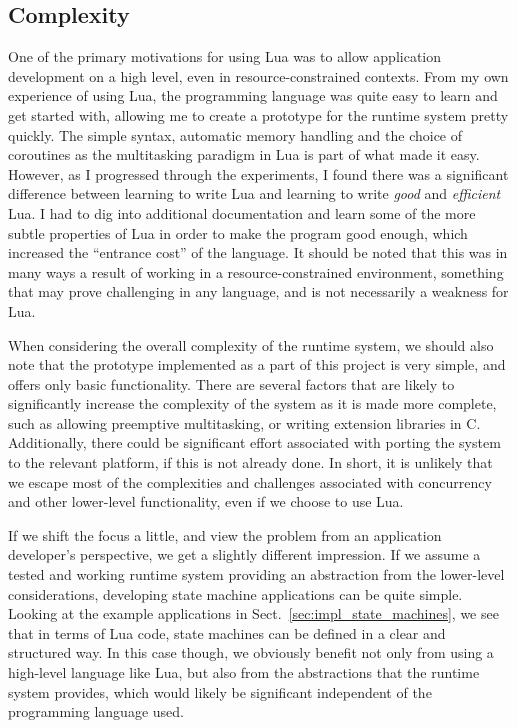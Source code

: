 \subsection{Complexity}
\label{sec:disq_complexity}
One of the primary motivations for using Lua was to allow application development on a high level, even in resource-constrained contexts. From my own experience of using Lua, the programming language was quite easy to learn and get started with, allowing me to create a prototype for the runtime system pretty quickly. The simple syntax, automatic memory handling and the choice of coroutines as the multitasking paradigm in Lua is part of what made it easy. However, as I progressed through the experiments, I found there was a significant difference between learning to write Lua and learning to write \emph{good} and \emph{efficient} Lua. I had to dig into additional documentation and learn some of the more subtle properties of Lua in order to make the program good enough, which increased the ``entrance cost'' of the language. It should be noted that this was in many ways a result of working in a resource-constrained environment, something that may prove challenging in any language, and is not necessarily a weakness for Lua.

When considering the overall complexity of the runtime system, we should also note that the prototype implemented as a part of this project is very simple, and offers only basic functionality. There are several factors that are likely to significantly increase the complexity of the system as it is made more complete, such as allowing preemptive multitasking, or writing extension libraries in C. Additionally, there could be significant effort associated with porting the system to the relevant platform, if this is not already done. In short, it is unlikely that we escape most of the complexities and challenges associated with concurrency and other lower-level functionality, even if we choose to use Lua.

If we shift the focus a little, and view the problem from an application developer's perspective, we get a slightly different impression. If we assume a tested and working runtime system providing an abstraction from the lower-level considerations, developing state machine applications can be quite simple. Looking at the example applications in Sect.~\ref{sec:impl_state_machines}, we see that in terms of Lua code, state machines can be defined in a clear and structured way. In this case though, we obviously benefit not only from using a high-level language like Lua, but also from the abstractions that the runtime system provides, which would likely be significant independent of the programming language used.

